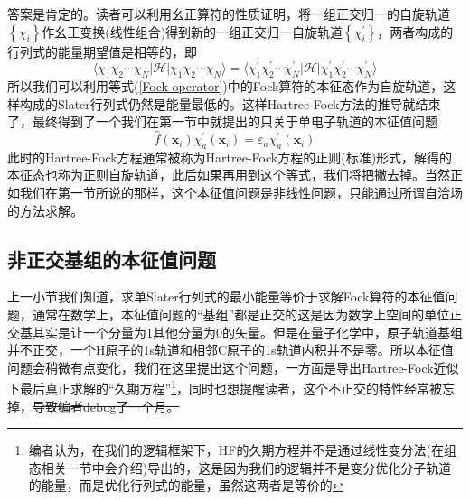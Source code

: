 \documentclass[12pt,a4paper,openany,twoside]{book}
\numberwithin{equation}{section}
\begin{document}
          答案是肯定的。读者可以利用幺正算符的性质证明，将一组正交归一的自旋轨道$\left\{\chi_i\right\}$作幺正变换(线性组合)得到新的一组正交归一自旋轨道$\left\{\chi_i^{\prime}\right\}$，两者构成的行列式的能量期望值是相等的，即
          \begin{equation}
            \langle\chi_1\chi_2\cdots\chi_N|\mathscr{H}|\chi_1\chi_2\cdots\chi_N\rangle = \langle\chi_1^{\prime}\chi_2^{\prime}\cdots\chi_N^{\prime}|\mathscr{H}|\chi_1^{\prime}\chi_2^{\prime}\cdots\chi_N^{\prime}\rangle
          \end{equation}
          所以我们可以利用等式(\ref{Fock operator})中的Fock算符的本征态作为自旋轨道，这样构成的Slater行列式仍然是能量最低的。这样Hartree-Fock方法的推导就结束了，最终得到了一个我们在第一节中就提出的只关于单电子轨道的本征值问题
          \begin{equation}
            \hat{f}(\mathbf{x}_i)\chi_a^{\prime}(\mathbf{x}_i) = \varepsilon_a\chi_a^{\prime}(\mathbf{x}_i)
          \end{equation}
          此时的Hartree-Fock方程通常被称为Hartree-Fock方程的正则(标准)形式，解得的本征态也称为正则自旋轨道，此后如果再用到这个等式，我们将把撇去掉。当然正如我们在第一节所说的那样，这个本征值问题是非线性问题，只能通过所谓自洽场的方法求解。
        \subsection{非正交基组的本征值问题}
          上一小节我们知道，求单Slater行列式的最小能量等价于求解Fock算符的本征值问题，通常在数学上，本征值问题的“基组”都是正交的这是因为数学上空间的单位正交基其实是让一个分量为1其他分量为0的矢量。但是在量子化学中，原子轨道基组并不正交，一个H原子的1s轨道和相邻C原子的1s轨道内积并不是零。所以本征值问题会稍微有点变化，我们在这里提出这个问题，一方面是导出Hartree-Fock近似下最后真正求解的“久期方程”\footnote{编者认为，在我们的逻辑框架下，HF的久期方程并不是通过线性变分法(在组态相关一节中会介绍)导出的，这是因为我们的逻辑并不是变分优化分子轨道的能量，而是优化行列式的能量，虽然这两者是等价的}，同时也想提醒读者，这个不正交的特性经常被忘掉，\sout{导致编者debug了一个月。}
\end{document}
